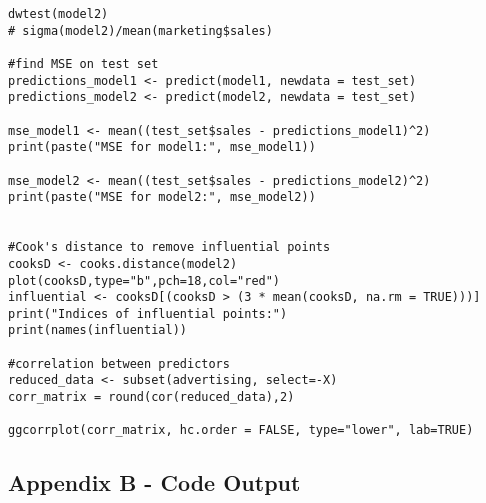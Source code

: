 \documentclass{article}
\begin{document}
\begin{verbatim}
dwtest(model2)
# sigma(model2)/mean(marketing$sales)

#find MSE on test set
predictions_model1 <- predict(model1, newdata = test_set)
predictions_model2 <- predict(model2, newdata = test_set)

mse_model1 <- mean((test_set$sales - predictions_model1)^2)
print(paste("MSE for model1:", mse_model1))

mse_model2 <- mean((test_set$sales - predictions_model2)^2)
print(paste("MSE for model2:", mse_model2))


#Cook's distance to remove influential points
cooksD <- cooks.distance(model2)
plot(cooksD,type="b",pch=18,col="red")
influential <- cooksD[(cooksD > (3 * mean(cooksD, na.rm = TRUE)))]
print("Indices of influential points:")
print(names(influential))

#correlation between predictors
reduced_data <- subset(advertising, select=-X)
corr_matrix = round(cor(reduced_data),2)

ggcorrplot(corr_matrix, hc.order = FALSE, type="lower", lab=TRUE)
\end{verbatim}

\subsection{Appendix B - Code Output}
\end{document}
